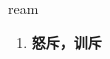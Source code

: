 
\begin{frame}
{\huge ream}
\begin{center}
\begin{enumerate}\Large
  \item \textbf{怒斥，训斥}
\end{enumerate}
\end{center}
\end{frame}
